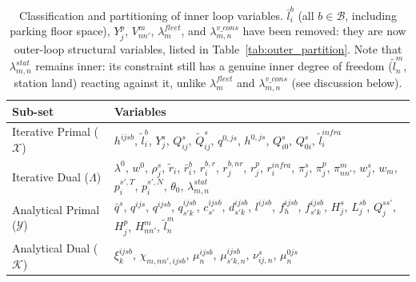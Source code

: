 \documentclass[11pt,a4paper]{article}
\begin{document}
\begin{table}[h!]
    \centering
    \small
    \renewcommand{\arraystretch}{1.2}
    \begin{tabular}{lp{11cm}}
        \toprule
        \textbf{Sub-set} & \textbf{Variables} \\
        \midrule
        Iterative Primal ($\mathcal{X}$) & $h^{ijsb}$, $\tilde l_i^b$, $Y_j^s$, $Q_{ij}^s$, $\tilde Q_{ij}^s$, $q^{0, js}$, $h^{0,js}$, $Q_{i0}^s$, $Q_{0i}^s$, $\tilde l_i^{infra}$ \\ \addlinespace
        Iterative Dual ($\Lambda$) & $\lambda^0$, $w^0$, $\rho_j^s$, $\tilde r_i$, $\bar r_i^b$, $r_i^{b,r}$, $r_j^{b,nr}$, $r_j^p$, $r_i^{infra}$, $\pi_j^s$, $\pi_j^p$, $\pi_{nn'}^m$, $w_j^s$, $w_m$, $p_i^{s',T}$, $p_i^{s',N}$, $\theta_0$, $\lambda^{stat}_{m,n}$ \\ \addlinespace
        Analytical Primal ($\mathcal{Y}$) & $\bar q^s$, $q^{ijs}$, $q^{ijsb}$, $q^{ijsb}_{s'k}$, $c^{ijsb}_{s'}$, $d^{ijsb}_{s'k}$, $l^{ijsb}$, $f_h^{ijsb}$, $f^{ijsb}_{s'k}$, $H_j^s$, $L_j^{sb}$, $Q_j^{ss'}$, $H_j^p$, $H_{nn'}^m$, $\tilde l^m_n$ \\ \addlinespace
        Analytical Dual ($\mathcal{K}$) & $\xi^{ijsb}_k$, $\chi_{m, nn', ijsb}$, $\mu^{ijsb}_n$, $\mu^{ijsb}_{s'k,n}$, $\nu^s_{ij,n}$, $\mu^{0js}_n$\\
        \bottomrule
    \end{tabular}
    \caption{Classification and partitioning of inner loop variables. $\bar l_i^b$ (all $b \in \mathcal{B}$, including parking floor space), $Y_j^p$, $V_{nn'}^m$, $\lambda^{fleet}_m$, and $\lambda^{v\_cons}_{m,n}$ have been removed: they are now outer-loop structural variables, listed in Table~\ref{tab:outer_partition}. Note that $\lambda^{stat}_{m,n}$ remains inner: its constraint still has a genuine inner degree of freedom ($\tilde l^m_n$, station land) reacting against it, unlike $\lambda^{fleet}_m$ and $\lambda^{v\_cons}_{m,n}$ (see discussion below).}
    \label{tab:partition_variables}
\end{table}
\end{document}
